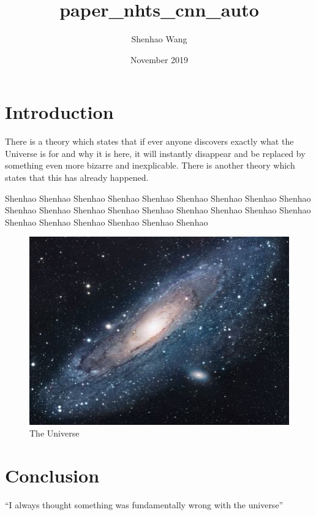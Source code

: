 \documentclass{article}
\title{paper_nhts_cnn_auto}
\author{Shenhao Wang}
\date{November 2019}
\begin{document}
\maketitle

\section{Introduction}
There is a theory which states that if ever anyone discovers exactly what the Universe is for and why it is here, it will instantly disappear and be replaced by something even more bizarre and inexplicable.
There is another theory which states that this has already happened.

Shenhao Shenhao Shenhao
Shenhao Shenhao Shenhao
Shenhao Shenhao Shenhao
Shenhao Shenhao Shenhao
Shenhao Shenhao Shenhao
Shenhao Shenhao Shenhao
Shenhao Shenhao Shenhao
Shenhao Shenhao Shenhao


\begin{figure}[h!]
\centering
\includegraphics[scale=1.7]{universe}
\caption{The Universe}
\label{fig:universe}
\end{figure}

\section{Conclusion}
``I always thought something was fundamentally wrong with the universe'' \citep{adams1995hitchhiker}



\end{document}

